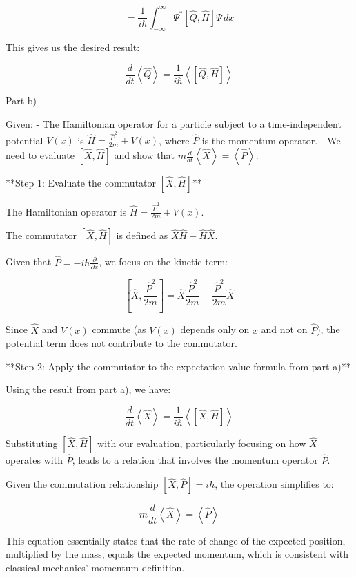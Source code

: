 \documentclass[a4paper,11pt]{article}
\begin{document}
\[
= \frac{1}{i\hbar} \int_{-\infty}^{\infty} \Psi^{*} \left[ \hat{Q}, \hat{H} \right] \Psi \, dx
\]

This gives us the desired result:

\[
\frac{d}{dt}\left<\hat{Q}\right> = \frac{1}{i\hbar}\left< \left[ \hat{Q}, \hat{H} \right] \right>
\]

Part b)

Given:
- The Hamiltonian operator for a particle subject to a time-independent potential \( V(x) \) is \( \hat{H} = \frac{\hat{P}^2}{2m} + V(x) \), where \( \hat{P} \) is the momentum operator.
- We need to evaluate \( \left[ \hat{X}, \hat{H}\right] \) and show that \( m\frac{d}{dt}\left<\hat{X}\right> = \left<\hat{P}\right> \).

**Step 1: Evaluate the commutator \(\left[ \hat{X}, \hat{H}\right]\)**

The Hamiltonian operator is \( \hat{H} = \frac{\hat{P}^2}{2m} + V(x) \).

The commutator \( \left[ \hat{X}, \hat{H}\right] \) is defined as \( \hat{X}\hat{H} - \hat{H}\hat{X} \).

Given that \( \hat{P} = -i\hbar\frac{\partial}{\partial x} \), we focus on the kinetic term:

\[
\left[ \hat{X}, \frac{\hat{P}^2}{2m} \right] = \hat{X}\frac{\hat{P}^2}{2m} - \frac{\hat{P}^2}{2m}\hat{X}
\]

Since \( \hat{X} \) and \( V(x) \) commute (as \( V(x) \) depends only on \( x \) and not on \( \hat{P} \)), the potential term does not contribute to the commutator.

**Step 2: Apply the commutator to the expectation value formula from part a)**

Using the result from part a), we have:

\[
\frac{d}{dt}\left<\hat{X}\right> = \frac{1}{i\hbar}\left< \left[ \hat{X}, \hat{H} \right] \right>
\]

Substituting \( \left[ \hat{X}, \hat{H}\right] \) with our evaluation, particularly focusing on how \( \hat{X} \) operates with \( \hat{P} \), leads to a relation that involves the momentum operator \( \hat{P} \).

Given the commutation relationship \( \left[ \hat{X}, \hat{P} \right] = i\hbar \), the operation simplifies to:

\[
m\frac{d}{dt}\left<\hat{X}\right> = \left<\hat{P}\right>
\]

This equation essentially states that the rate of change of the expected position, multiplied by the mass, equals the expected momentum, which is consistent with classical mechanics' momentum definition.
\end{document}
